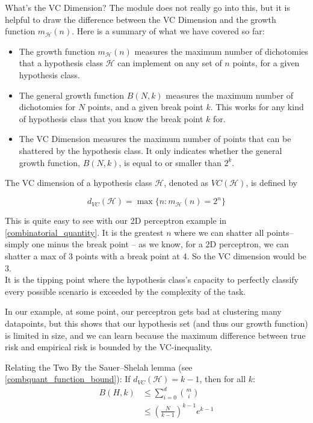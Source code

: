 \begin{commentbox}{What's the VC Dimension?}
The module does not really go into this, but it is helpful to draw the difference between the VC Dimension and the growth function $m_\mathcal{H}(n)$. Here is a summary of what we have covered so far:

\begin{itemize}
    \item The growth function $m_{\mathcal{H}}(n) $ measures the maximum number of dichotomies that a hypothesis class $\mathcal{H}$ can implement on any set of $n$ points, for a given hypothesis class.
    \item The general growth function $B(N,k)$ measures the maximum number of dichotomies for $N$ points, and a given break point $k$. This works for any kind of hypothesis class that you know the break point $k$ for.
    \item The VC Dimension measures the maximum number of points that can be shattered by the hypothesis class. It only indicates whether the general growth function, $B(N, k)$, is equal to or smaller than $2^k$.
    
\end{itemize}
The VC dimension of a hypothesis class $\mathcal{H}$, denoted as $VC(\mathcal{H})$, is defined by

 \[d_{VC}(\mathcal{H})=\max\{n : m_{\mathcal{H}}(n) = 2^n\}\]

 This is quite easy to see with our 2D perceptron example in \ref{combinatorial_quantity}. It is the greatest $n$ where we can shatter all points– simply one minus the break point – as we know, for a 2D perceptron, we can shatter a max of 3 points with a break point at 4. So the VC dimension would be 3.\\

It is the tipping point where the hypothesis class's capacity to perfectly classify every possible scenario is exceeded by the complexity of the task.

 In our example, at some point, our perceptron gets bad at clustering many datapoints, but this shows that our hypothesis set (and thus our growth function) is limited in size, and we can learn because the maximum difference between true risk and empirical risk is bounded by the VC-inequality.



\begin{sidenotebox}{Relating the Two}
By the Sauer–Shelah lemma (see \ref{combquant_function_bound}):
If $d_{VC}(\mathcal{H}) = k-1$, then for all $k$:
\begin{align*}
B(H, k) &\leq \sum_{i=0}^{d} \binom{m}{i}\\
&\leq \left(\frac{N}{k-1}\right)^{k-1} e^{k-1}
\end{align*}



\end{sidenotebox}
\end{commentbox}
